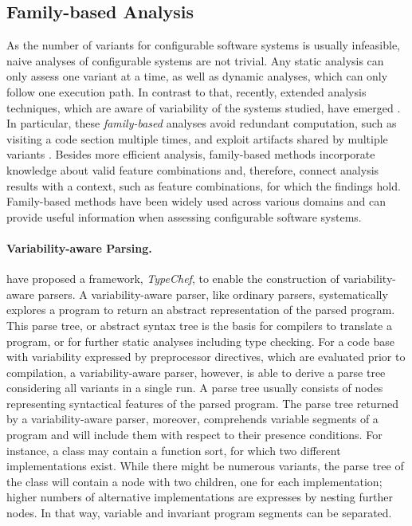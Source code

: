 \subsection{Family-based Analysis}
As the number of variants for configurable software systems is usually
infeasible, naive analyses of configurable systems are not trivial. Any static
analysis can only assess one variant at a time, as well as dynamic analyses,
which can only follow one execution path. 
In contrast to that, recently,
extended analysis techniques, which are aware of variability of the systems
studied, have emerged \citep{thum_classification_2014}. In particular, these
\emph{family-based} analyses avoid redundant computation, such as visiting a
code section multiple times, and exploit artifacts shared by multiple variants \citep{thum_classification_2014}. Besides more
efficient analysis, family-based methods incorporate knowledge about valid
feature combinations \citep{thum_classification_2014} and, therefore, connect analysis results with
a context, such as feature combinations, for which the findings hold.
Family-based methods have been widely used across various domains and can
provide useful information when assessing configurable software systems.

\paragraph{Variability-aware Parsing.} \cite{kastner_variability-aware_2011}
have proposed a framework, \emph{TypeChef}, to enable the construction of variability-aware parsers. A variability-aware parser, like
ordinary parsers, systematically explores a program to return an abstract
representation of the parsed program. This parse tree, or abstract syntax tree
is the basis for compilers to translate a program, or for further static
analyses including type checking. For a code base with variability expressed by
preprocessor directives, which are evaluated prior to compilation, a
variability-aware parser, however, is able to derive a parse tree considering
all variants in a single run. A parse tree usually consists of nodes
representing syntactical features of the parsed program. The parse tree
returned by a variability-aware parser, moreover, comprehends variable segments
of a program and will include them with respect to their presence conditions.
For instance, a class may contain a function sort, for which two different
implementations exist. While there might be numerous variants, the parse tree
of the class will contain a node with two children, one for each
implementation; higher numbers of alternative implementations are expresses by
nesting further nodes. In that way, variable and invariant program segments
can be separated.

